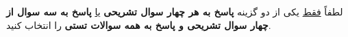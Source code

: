 \documentclass[a4paper]{article}
\makeatletter
\def\theenumii{\@abjad \c@enumii}
\let\endgraph\par
\makeatother
\begin{document}
	\vspace*{0mm}
\iffalse	
	\centerline{\ \ \ \ \ \ \ \ \fbox{\fbox{\hbox{\ \ \ \ \parbox{12cm}{%
						\begin{itemize}
							\itemsep=-1mm
							\item همهٔ پاسخ‌هایتان را خوانا، با توضیح دقیق و کامل و مستدل بنویسید.
							\endgraph
							\vspace*{-.3cm}
						\end{itemize}
	}}}}}
	
	\vspace*{5mm}
\fi



\medskip

		\def\labelenumi{\textbf{\theenumi}.}
		\def\labelenumii{({\theenumii})}
\vspace*{-1.6cm}
\hspace*{-.8cm}
لطفاً  \underline{فقط} یکی از دو گزینه \textbf{پاسخ به هر چهار سوال تشریحی }
\hspace*{.2cm}
\underline{یا} \hspace*{.2cm}
\textbf{پاسخ به سه سوال از چهار سوال تشریحی و پاسخ به همه سوالات تستی}  را  انتخاب کنید.
\end{document}
